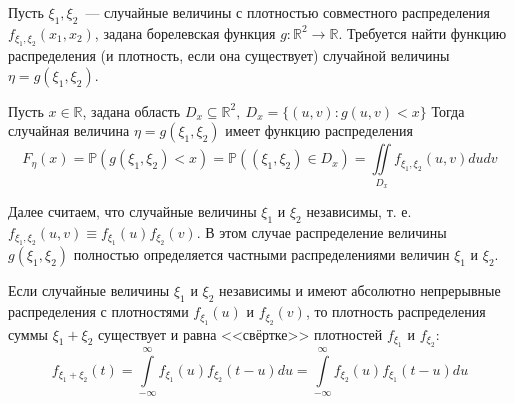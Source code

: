 Пусть $\xi_1, \xi_2$~--- случайные величины с плотностью совместного распределения $f_{\xi_{1}, \xi_{2}}\left(x_{1}, x_{2}\right)$, задана борелевская функция $g\colon \mathbb{R}^{2} \rightarrow \mathbb{R}$. 
Требуется найти функцию распределения (и плотность, если она существует) случайной величины $\eta=g\left(\xi_{1}, \xi_{2}\right)$.
\begin{lem}
    Пусть $x \in \mathbb{R}$, задана область $D_{x} \subseteq \mathbb{R}^{2},~ D_x = \{(u,v)\colon g(u,v) < x\}$ Тогда случайная величина $\eta=g\left(\xi_{1}, \xi_{2}\right)$ имеет функцию распределения
    \begin{equation*}
        F_{\eta}(x)=\mathbb{P}\left(g\left(\xi_{1}, \xi_{2}\right)<x\right)=\mathbb{P}\left(\left(\xi_{1}, \xi_{2}\right) \in D_{x}\right)=\iint\limits_{D_{x}} f_{\xi_{1}, \xi_{2}}(u, v) d u d v
    \end{equation*}
\end{lem}
Далее считаем, что случайные величины $\xi_1$ и $\xi_2$ независимы, т. е. $f_{\xi_{1}, \xi_{2}}(u, v) \equiv f_{\xi_{1}}(u) f_{\xi_{2}}(v)$. В этом случае распределение величины $g\left(\xi_{1}, \xi_{2}\right)$ полностью определяется частными распределениями величин $\xi_1$ и $\xi_2$.
\begin{namedthm}
    Если случайные величины $\xi_1$ и $\xi_2$ независимы и имеют абсолютно непрерывные распределения с плотностями $f_{\xi_{1}}(u)$ и $f_{\xi_{2}}(v)$, то плотность распределения суммы $\xi_{1}+\xi_{2}$ существует и равна <<свёртке>> плотностей $f_{\xi_{1}}$ и $f_{\xi_{2}}$:
    \begin{equation*}
        f_{\xi_{1}+\xi_{2}}(t)=\int\limits_{-\infty}^{\infty} f_{\xi_{1}}(u) f_{\xi_{2}}(t-u) d u=\int\limits_{-\infty}^{\infty} f_{\xi_{2}}(u) f_{\xi_{1}}(t-u) d u
    \end{equation*}
\end{namedthm}

